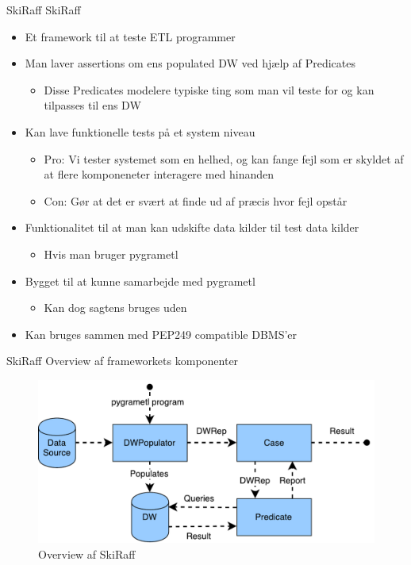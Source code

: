 \begin{frame}{SkiRaff}{}
  SkiRaff
  \begin{itemize}
  \item<2-> Et framework til at teste ETL programmer
  \item<3-> Man laver assertions om ens populated DW ved hjælp af Predicates
    \begin{itemize}
      \item Disse Predicates modelere typiske ting som man vil teste for og kan tilpasses til ens DW
    \end{itemize}
  \item<4-> Kan lave funktionelle tests på et system niveau
    \begin{itemize}
    \item Pro: Vi tester systemet som en helhed, og kan fange fejl som er skyldet af at flere komponeneter interagere med hinanden
    \item Con: Gør at det er svært at finde ud af præcis hvor fejl opstår
    \end{itemize}
  \item<5-> Funktionalitet til at man kan udskifte data kilder til test data kilder
    \begin{itemize}
    \item Hvis man bruger pygrametl
    \end{itemize}
  \item<6-> Bygget til at kunne samarbejde med pygrametl
    \begin{itemize}
    \item Kan dog sagtens bruges uden
    \end{itemize}
  \item<7-> Kan bruges sammen med PEP249 compatible DBMS'er
  \end{itemize}
\end{frame}

\begin{frame}{SkiRaff}{}
  Overview af frameworkets komponenter
  \begin{figure}
    \centering
    \includegraphics[width=1\textwidth]{figures/overview.pdf}
    \caption{Overview af SkiRaff}
    \label{overview}
  \end{figure}
\end{frame}


